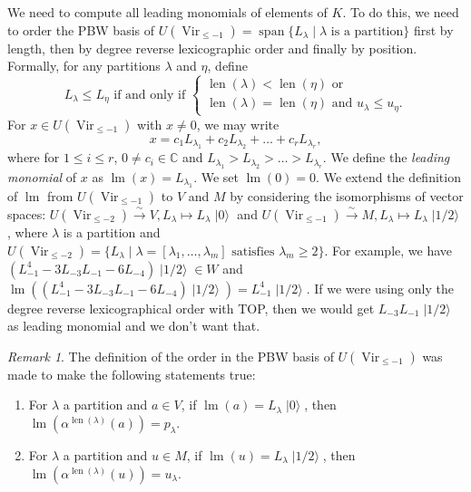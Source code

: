 \documentclass[a4paper, 12pt, reqno]{amsart}
\theoremstyle{remark}
\newtheorem{remark}[theorem]{Remark}
\numberwithin{equation}{subsection}
\DeclareMathOperator{\Vir}{Vir}
\DeclareMathOperator{\lm}{lm}
\DeclareMathOperator{\vspan}{span}
\DeclareMathOperator{\len}{len}
\DeclareMathOperator{\vac}{|0\rangle}
\DeclareMathOperator{\vachalf}{|1/2\rangle}
\begin{document}
We need to compute all leading monomials of elements of $K$.
To do this, we need to order the PBW basis of $U(\Vir_{\le -1}) = \vspan\{L_{\lambda} \mid \lambda\text{ is a partition}\}$ first by length, then by degree reverse lexicographic order and finally by position.
Formally, for any partitions $\lambda$ and $\eta$, define
\begin{equation*}
  L_{\lambda} \le L_{\eta}\text{ if and only if }
  \begin{cases}
    \len(\lambda) < \len(\eta)\text{ or } \\
    \len(\lambda) = \len(\eta)\text{ and }u_{\lambda} \le u_{\eta}.
  \end{cases}
\end{equation*}
For $x \in U(\Vir_{\le -1})$ with $x \neq 0$, we may write
\begin{equation*}
  x = c_1L_{\lambda_1} + c_2L_{\lambda_2} + \dots + c_rL_{\lambda_r},
\end{equation*}
where for $1 \le i \le r$, $0 \neq c_i \in \mathbb{C}$ and $L_{\lambda_1} > L_{\lambda_2} > \dots > L_{\lambda_r}$.
We define the \emph{leading monomial} of $x$ as $\lm(x) = L_{\lambda_1}$.
We set $\lm(0) = 0$.
We extend the definition of $\lm$ from $U(\Vir_{\le -1})$ to $V$ and $M$ by considering the isomorphisms of vector spaces: $U(\Vir_{\le -2}) \xrightarrow{\sim} V, L_{\lambda} \mapsto L_{\lambda}\vac$ and $U(\Vir_{\le -1}) \xrightarrow{\sim} M, L_{\lambda} \mapsto L_{\lambda}\vachalf$, where $\lambda$ is a partition and $U(\Vir_{\le -2}) = \{L_{\lambda} \mid \lambda = [\lambda_1, \dots, \lambda_m]\text{ satisfies }\lambda_m \ge 2\}$.
For example, we have $(L_{-1}^4 - 3L_{-3}L_{-1} - 6L_{-4})\vachalf \in W$ and $\lm((L_{-1}^4 - 3L_{-3}L_{-1} - 6L_{-4})\vachalf) = L_{-1}^4\vachalf$.
If we were using only the degree reverse lexicographical order with TOP, then we would get $L_{-3}L_{-1}\vachalf$ as leading monomial and we don't want that.

\begin{remark}
  \label{rmk:39}
  The definition of the order in the PBW basis of $U(\Vir_{\le -1})$ was made to make the following statements true:
  \begin{enumerate}
  \item For $\lambda$ a partition and $a \in V$, if $\lm(a) = L_{\lambda}\vac$, then $\lm(\alpha^{\len(\lambda)}(a)) = p_{\lambda}$.
  \item For $\lambda$ a partition and $u \in M$, if $\lm(u) = L_{\lambda}\vachalf$, then $\lm(\alpha^{\len(\lambda)}(u)) = u_{\lambda}$.
  \end{enumerate}
\end{remark}
\end{document}
